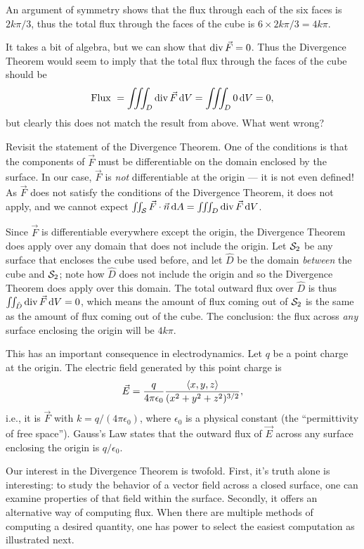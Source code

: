 \begin{example}
An argument of symmetry shows that the flux through each of the six faces is $2k\pi/3$, thus the total flux through the faces of the cube is $6\times2k\pi/3 = 4k\pi$.

It takes a bit of algebra, but we can show that $\operatorname{div}\vec F = 0$. Thus the Divergence Theorem would seem to imply that the total flux through the faces of the cube should be 
\[\text{Flux }=\iiint_D \operatorname{div} \vec F\operatorname{d}\! V = \iiint_D 0\operatorname{d}\! V = 0,\]
but clearly this does not match the result from above. What went wrong?

Revisit the statement of the Divergence Theorem. One of the conditions is that the components of $\vec F$ must be differentiable on the domain enclosed by the surface. In our case, $\vec F$ is \emph{not} differentiable at the origin --- it is not even defined! As $\vec F$ does not satisfy the conditions of the Divergence Theorem, it does not apply, and we cannot expect $\iint_{\mathcal{S}} \vec F\cdot\vec n\operatorname{d}\! A = \iiint_D \operatorname{div}\vec F\operatorname{d}\! V$.

Since $\vec F$ is differentiable everywhere except the origin, the Divergence Theorem does apply over any domain that does not include the origin. Let $\mathcal{S}_2$ be any surface that encloses the cube used before, and let $\hat D$ be the domain \emph{between} the cube and $\mathcal{S}_2$; note how $\hat D$ does not include the origin and so the Divergence Theorem does apply over this domain. The total outward flux over $\hat D$ is thus $\iint_{\hat D}\operatorname{div} \vec F\operatorname{d}\! V = 0$, which means the amount of flux coming out of $\mathcal{S}_2$ is the same as the amount of flux coming out of the cube. The conclusion: the flux across \emph{any} surface enclosing the origin will be $4k\pi$. 

This has an important consequence in electrodynamics. Let $q$ be a point charge at the origin. The electric field generated by this point charge is 
\[\vec E = \frac{q}{4\pi \epsilon_0}\frac{\left\langle x,y,z\right\rangle}{(x^2+y^2+z^2)^{3/2}},\]
i.e., it is $\vec F$ with $k = q/(4\pi \epsilon_0)$, where $\epsilon_0$ is a physical constant (the ``permittivity of free space''). Gauss's Law states that the outward flux of $\vec E$ across any surface enclosing the origin is $q/\epsilon_0$.
\end{example}

Our interest in the Divergence Theorem is twofold. First, it's truth alone is interesting: to study the behavior of a vector field across a closed surface, one can examine properties of that field within the surface. Secondly, it offers an alternative way of computing flux. When there are multiple methods of computing a desired quantity, one has power to select the easiest computation as illustrated next.

